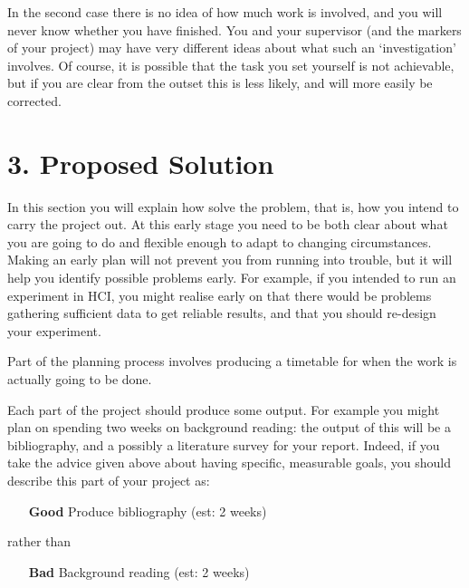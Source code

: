 \documentclass[11pt, a4paper, twoside, openright]{report}
\begin{document}
In the second case there is no idea of how much work is involved, and
you will never know whether you have finished. You and your supervisor
(and the markers of your project) may have very different ideas about
what such an `investigation' involves. Of course, it is possible that
the task you set yourself is not achievable, but if you are clear from
the outset this is less likely, and will more easily be corrected.

\section*{3. Proposed Solution}

%
%

In this section you will explain how solve the problem, that is, how
you intend to carry the project out. At this early stage you need to
be both clear about what you are going to do and flexible enough to
adapt to changing circumstances. Making an early plan will not prevent
you from running into trouble, but it will help you identify possible
problems early. For example, if you intended to run an experiment in
HCI, you might realise early on that there would be problems gathering
sufficient data to get reliable results, and that you should re-design
your experiment.

Part of the planning process involves producing a timetable for when
the work is actually going to be done.

Each part of the project should produce some output. For example you
might plan on spending two weeks on background reading: the output of
this will be a bibliography, and a possibly a literature survey for
your report. Indeed, if you take the advice given above about having
specific, measurable goals, you should describe this part of your
project as:

\begin{itemize}
    \item[\bf Good] Produce bibliography (est: 2 weeks)
\end{itemize}
rather than
\begin{itemize}
    \item[\bf Bad] Background reading (est: 2 weeks)
\end{itemize}
\end{document}
